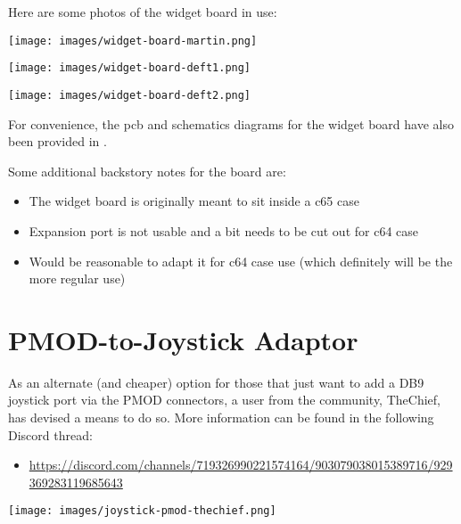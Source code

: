 Here are some photos of the widget board in use:
  \begin{center}
    \texttt{[image: images/widget-board-martin.png]}
  \end{center}
  \begin{center}
    \texttt{[image: images/widget-board-deft1.png]}
  \end{center}
  \begin{center}
    \texttt{[image: images/widget-board-deft2.png]}
  \end{center}

For convenience, the pcb and schematics diagrams for the widget board have also been provided in .

Some additional backstory notes for the board are:

\begin{itemize}
  \item{The widget board is originally meant to sit inside a c65 case}
  \item{Expansion port is not usable and a bit needs to be cut out for c64 case}
  \item{Would be reasonable to adapt it for c64 case use (which definitely will be the more regular use)}
\end{itemize}

\section{PMOD-to-Joystick Adaptor}

As an alternate (and cheaper) option for those that just want to add a DB9 joystick port via the PMOD connectors, a user from the community, TheChief, has devised a means to do so. More information can be found in the following Discord thread:

\begin{itemize}
  \item \url{https://discord.com/channels/719326990221574164/903079038015389716/929369283119685643}
\end{itemize}

  \begin{center}
    \texttt{[image: images/joystick-pmod-thechief.png]}
  \end{center}

